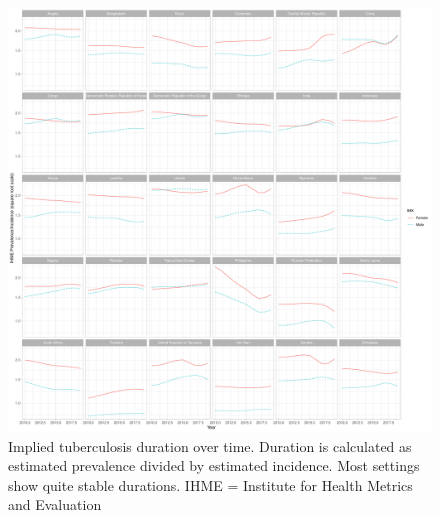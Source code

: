 \documentclass[12pt]{article}
\begin{document}
\begin{figure}
\centering
\includegraphics[width=1\textwidth]{../plots/aF6.pdf}
\caption[Implied duration over time]{Implied tuberculosis duration over time. Duration is
  calculated as estimated prevalence divided by estimated incidence. Most
  settings show quite stable durations. IHME = Institute for Health Metrics
  and Evaluation}
\end{figure}
\end{document}
